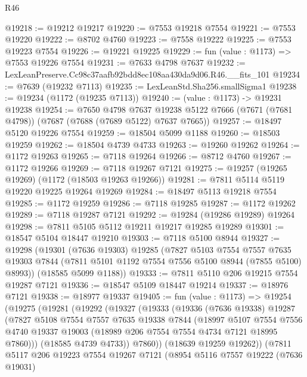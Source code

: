 \begin{lexlean}{R46}
\begin{coremodule}
@19218 := @19212 @19217
@19220 := @7553 @19218 @7554
@19221 := @7553 @19220
@19222 := @8702 @4760
@19223 := @7558 @19222
@19225 := @7553 @19223 @7554
@19226 := @19221 @19225
@19229 := fun (value : @1173) => @7553 @19226 @7554
@19231 := @7633 @4798 @7637
@19232 := LexLeanPreserve.Cc98c37aafb92bdd8ec108aa430da9d06.R46.__fits_101
@19234 := @7639 (@19232 @7113)
@19235 := LexLeanStd.Sha256.smallSigma1
@19238 := @19234 (@1172 (@19235 @7113))
@19240 := (value : @1173) -> @19231 @19238
@19254 := @7650
    @4798
    @7637
    @19238
    @5122
    @7666
    (@7671 (@7681 @4798))
    (@7687 (@7688 (@7689 @5122) @7637 @7665))
@19257 := @18497 @5120 @19226 @7554
@19259 := @18504 @5099 @1188
@19260 := @18503 @19259
@19262 := @18504 @4739 @4733
@19263 := @19260 @19262
@19264 := @1172 @19263
@19265 := @7118 @19264
@19266 := @8712 @4760
@19267 := @1172 @19266
@19269 := @7118 @19267 @7121
@19275 := @19257 (@19265 @19269) (@1172 (@18503 @19263 @19266))
@19281 := @7811 @5114 @5119 @19220 @19225 @19264 @19269
@19284 := @18497 @5113 @19218 @7554
@19285 := @1172 @19259
@19286 := @7118 @19285
@19287 := @1172 @19262
@19289 := @7118 @19287 @7121
@19292 := @19284 (@19286 @19289) @19264
@19298 := @7811 @5105 @5112 @19211 @19217 @19285 @19289
@19301 := @18547 @5104 @18447 @19210
@19303 := @7118 @5100 @8944
@19327 := @19298
    (@19301
      (@7636 @19303)
      @19285
      (@7827
        @5103
        @7554
        @7557
        @7635
        @19303
        @7844
        (@7811 @5101 @1192 @7554 @7556 @5100 @8944 (@7855 @5100) @8993))
      (@18585 @5099 @1188))
@19333 := @7811 @5110 @206 @19215 @7554 @19287 @7121
@19336 := @18547 @5109 @18447 @19214
@19337 := @18976 @7121
@19338 := @18977 @19337
@19405 := fun (value : @1173) =>
  @19254
    (@19275
      (@19281
        (@19292
          (@19327
            (@19333
              (@19336
                (@7636 @19338)
                @19287
                (@7827
                  @5108
                  @7554
                  @7557
                  @7635
                  @19338
                  @7844
                  (@18997
                    @5107
                    @7554
                    @7556
                    @4740
                    @19337
                    @19003
                    (@18989 @206 @7554 @7554 @4734 @7121 @18995 @7860)))
                (@18585 @4739 @4733))
              @7860))
          (@18639 @19259 @19262))
        (@7811
          @5117
          @206
          @19223
          @7554
          @19267
          @7121
          (@8954
            @5116
            @7557
            @19222
            (@7636 @19031)

\end{coremodule}
\end{lexlean}
